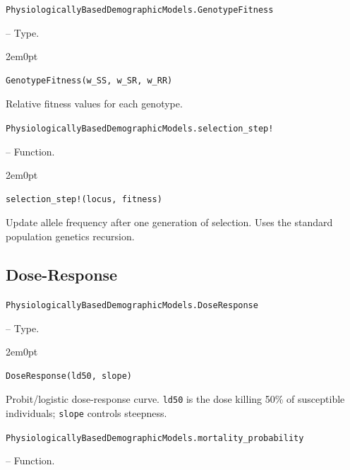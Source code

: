 \label{13562544084430009719}{}

\hypertarget{11019413257212639600}{\texttt{PhysiologicallyBasedDemographicModels.GenotypeFitness}}  -- {Type.}

\begin{adjustwidth}{2em}{0pt}


\begin{verbatim}
GenotypeFitness(w_SS, w_SR, w_RR)
\end{verbatim}

Relative fitness values for each genotype.



\end{adjustwidth}
\hypertarget{13313670729107274814}{\texttt{PhysiologicallyBasedDemographicModels.selection\_step!}}  -- {Function.}

\begin{adjustwidth}{2em}{0pt}


\begin{verbatim}
selection_step!(locus, fitness)
\end{verbatim}

Update allele frequency after one generation of selection. Uses the standard population genetics recursion.



\end{adjustwidth}

\subsection{Dose-Response}



\label{3432971129757000111}{}

\hypertarget{14815171869210954319}{\texttt{PhysiologicallyBasedDemographicModels.DoseResponse}}  -- {Type.}

\begin{adjustwidth}{2em}{0pt}


\begin{verbatim}
DoseResponse(ld50, slope)
\end{verbatim}

Probit/logistic dose-response curve. \texttt{ld50} is the dose killing 50\% of susceptible individuals; \texttt{slope} controls steepness.



\end{adjustwidth}
\hypertarget{13633307999245392997}{\texttt{PhysiologicallyBasedDemographicModels.mortality\_probability}}  -- {Function.}

